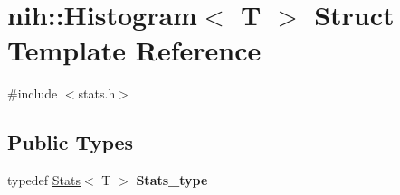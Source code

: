 \hypertarget{structnih_1_1_histogram}{
\section{nih\-:\-:\-Histogram$<$ \-T $>$ \-Struct \-Template \-Reference}
\label{structnih_1_1_histogram}
}


{\ttfamily \#include $<$stats.\-h$>$}

\subsection*{\-Public \-Types}
\begin{DoxyCompactItemize}
\item 
\hypertarget{structnih_1_1_histogram_a1f51fd52c25d8e39a5bdf46c102c2f9c}{
typedef \hyperlink{structnih_1_1_stats}{\-Stats}$<$ \-T $>$ {\bfseries \-Stats\-\_\-type}}
\label{structnih_1_1_histogram_a1f51fd52c25d8e39a5bdf46c102c2f9c}

\end{DoxyCompactItemize}
